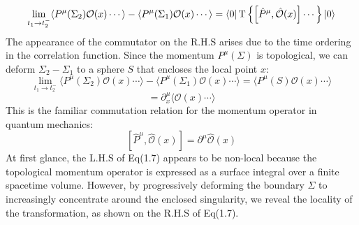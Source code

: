 \documentclass[12pt]{article}
\numberwithin{equation}{section}
\newcommand\<\langle
\renewcommand\>\rangle
\renewcommand\.{\cdot}
\begin{document}
\begin{equation}
    \lim_{t_1\rightarrow t_2^{-}}\langle P^{\mu}(\Sigma_2)\mathcal{O}(x)\cdots\rangle-\langle P^{\mu}(\Sigma_1)\mathcal{O}(x)\cdots\rangle = \bra{0}\text{T}\left\{\left[\hat{P}^\mu,\hat{\mathcal{O}}(x)\right]\cdots\right\}\ket{0}
\end{equation}
The appearance of the commutator on the R.H.S arises due to the time ordering in the correlation function. Since the momentum \( P^{\mu}(\Sigma) \) is topological, we can deform \( \Sigma_2 - \Sigma_1 \) to a sphere \( S \) that encloses the local point \( x \):
\[
    \lim_{t_1\rightarrow t_2^{-}}\langle P^{\mu}(\Sigma_2)\mathcal{O}(x)\cdots\rangle-\langle P^{\mu}(\Sigma_1)\mathcal{O}(x)\cdots\rangle = \langle P^{\mu}(S)\mathcal{O}(x)\cdots\rangle 
\]
\[
    =\partial_{x}^{\mu}\langle\mathcal{O}(x)\cdots\rangle
\]
This is the familiar commutation relation for the momentum operator in quantum mechanics:
\begin{equation}
    \left[\hat{P}^{\mu}, \hat{\mathcal{O}}(x)\right] = \partial^{\mu}\hat{\mathcal{O}}(x)
\end{equation}
At first glance, the L.H.S of Eq(1.7) appears to be non-local because the topological momentum operator is expressed as a surface integral over a finite spacetime volume. However, by progressively deforming the boundary \( \Sigma \) to increasingly concentrate around the enclosed singularity, we reveal the locality of the transformation, as shown on the R.H.S of Eq(1.7).
\end{document}
